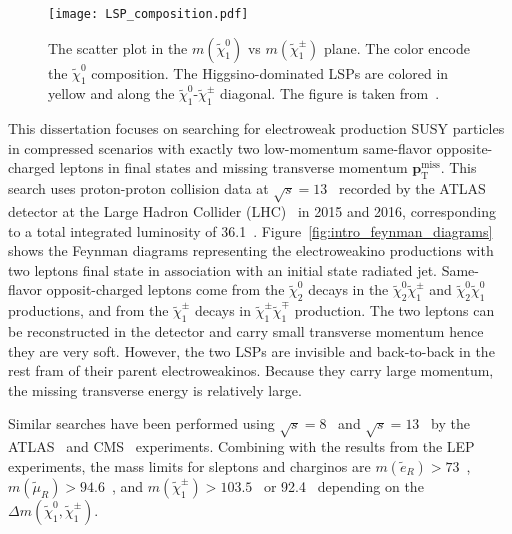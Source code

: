 \begin{figure}[htbp]
    \begin{center}
        \texttt{[image: LSP\_composition.pdf]}
        \caption{The scatter plot in the $m(\widetilde{\chi}^{0}_{1})$ vs $m(\widetilde{\chi}^{\pm}_{1})$ plane.
        The color encode the $\widetilde{\chi}^{0}_{1}$ composition.
        The Higgsino-dominated LSPs are colored in yellow and along the $\widetilde{\chi}^{0}_{1}$-$\widetilde{\chi}^{\pm}_{1}$ diagonal.
        The figure is taken from~\cite{Aaboud:2016wna}.}
        \label{fig:intro_LSP_composition}
    \end{center}
\end{figure}

This dissertation focuses on searching for electroweak production SUSY particles in compressed scenarios with exactly two low-momentum same-flavor opposite-charged leptons in final states and missing transverse momentum $\textbf{p}_{\text{T}}^{\text{miss}}$.
This search uses proton-proton collision data at $\sqrt{s} = 13$~{\TeV} recorded by the ATLAS detector at the Large Hadron Collider (LHC)~\cite{Evans:2008zzb} in 2015 and 2016, corresponding to a total integrated luminosity of 36.1~\ifb.
Figure~\ref{fig:intro_feynman_diagrams} shows the Feynman diagrams representing the electroweakino productions with two leptons final state in association with an initial state radiated jet.
Same-flavor opposit-charged leptons come from the $\widetilde{\chi}^{0}_{2}$ decays in the $\widetilde{\chi}^{0}_{2} \widetilde{\chi}^{\pm}_{1}$ and $\widetilde{\chi}^{0}_{2} \widetilde{\chi}^{0}_{1}$ productions, and from the $\widetilde{\chi}^{\pm}_{1}$ decays in $\widetilde{\chi}^{\pm}_{1} \widetilde{\chi}^{\mp}_{1}$ production.
The two leptons can be reconstructed in the detector and carry small transverse momentum  \pt hence they are very soft.
However, the two LSPs are invisible and back-to-back in the rest fram of their parent electroweakinos.
Because they carry large momentum, the missing transverse energy \met is relatively large.

Similar searches have been performed using $\sqrt{s} = 8$~{\TeV} and $\sqrt{s} = 13$~{\TeV} by the ATLAS~\cite{Aad:2014vma, Aad:2014nua, Aad:2015eda, Aaboud:2016wna} and CMS~\cite{Khachatryan:2014qwa, Khachatryan:2015pot, Sirunyan:2017lae} experiments.
Combining with the results from the LEP experiments, the mass limits for sleptons and charginos are $m(\widetilde{e}_{R}) > 73$~{\GeV}, $m(\widetilde{\mu}_{R}) > 94.6$~{\GeV}, and $m(\widetilde{\chi}^{\pm}_{1}) > 103.5$~{\GeV} or 92.4~{\GeV} depending on the $\Delta m(\widetilde{\chi}^{0}_{1}, \widetilde{\chi}^{\pm}_{1})$.

